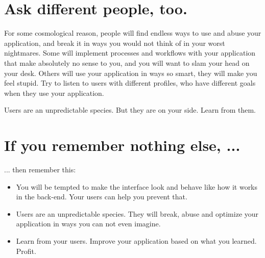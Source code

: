 \section*{Ask different people, too.}

For some cosmological reason, people will find endless ways to use and abuse
your application, and break it in ways you would not think of in your worst
nightmares. Some will implement processes and workflows with your application
that make absolutely no sense to you, and you will want to slam your head on
your desk. Others will use your application in ways so smart, they will make you
feel stupid. Try to listen to users with different profiles, who have different
goals when they use your application.

Users are an unpredictable species. But they are on your side. Learn from them.

\section*{If you remember nothing else, ...}
... then remember this:
\begin{itemize}
 \item You will be tempted to make the interface look and behave like how it
works in the back-end. Your users can help you prevent that.
 \item Users are an unpredictable species. They will break, abuse and optimize
your application in ways you can not even imagine.
 \item Learn from your users. Improve your application based on what you
learned. Profit.
\end{itemize}
